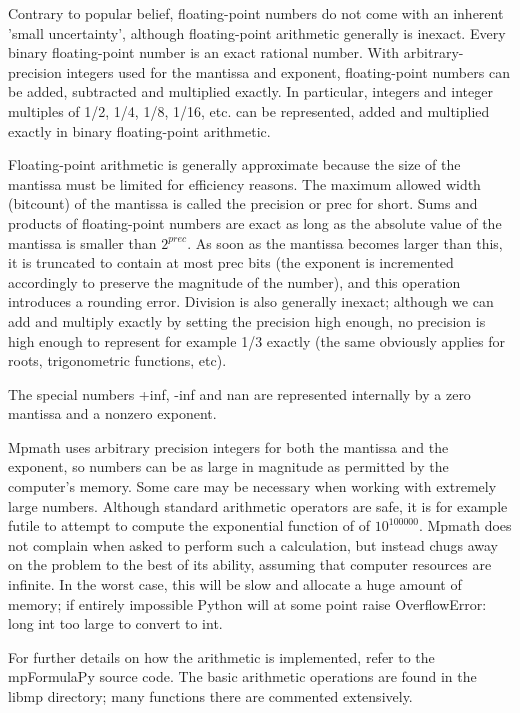 \vpara
Contrary to popular belief, floating-point numbers do not come with an inherent 'small uncertainty', although floating-point arithmetic generally is inexact. Every binary floating-point number is an exact rational number. With arbitrary-precision integers used for the mantissa and exponent, floating-point numbers can be added, subtracted and multiplied exactly. In particular, integers and integer multiples of 1/2, 1/4, 1/8, 1/16, etc. can be represented, added and multiplied exactly in binary floating-point arithmetic.

\vpara
Floating-point arithmetic is generally approximate because the size of the mantissa must be limited for efficiency reasons. The maximum allowed width (bitcount) of the mantissa is called the precision or prec for short. Sums and products of floating-point numbers are exact
as long as the absolute value of the mantissa is smaller than $2^{prec}$. As soon as the mantissa becomes larger than this, it is truncated to contain at most prec bits (the exponent is incremented accordingly to preserve the magnitude of the number), and this operation introduces a rounding error. Division is also generally inexact; although we can add and
multiply exactly by setting the precision high enough, no precision is high enough to represent for example 1/3 exactly (the same obviously applies for roots, trigonometric functions, etc).

\vpara
The special numbers +inf, -inf and nan are represented internally by a zero mantissa and a nonzero exponent.

\vpara
Mpmath uses arbitrary precision integers for both the mantissa and the exponent, so numbers can be as large in magnitude as permitted by the computer's memory. Some care may be necessary when working with extremely large numbers. Although standard arithmetic operators are safe, it is for example futile to attempt to compute the exponential
function of of $10^{100000}$. Mpmath does not complain when asked to perform such a calculation, but instead chugs away on the problem to the best of its ability, assuming that computer resources are infinite. In the worst case, this will be slow and allocate a huge amount of memory; if entirely impossible Python will at some point raise OverflowError: long int too large to convert to int.

\vpara
For further details on how the arithmetic is implemented, refer to the mpFormulaPy source code. The basic arithmetic operations are found in the libmp directory; many functions there are commented extensively.






